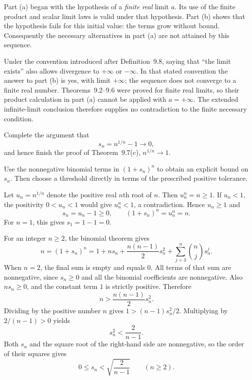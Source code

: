 Part \textup{(a)} began with the hypothesis of a \emph{finite real}
limit $a$. Its use of the finite product and scalar limit laws is
valid under that hypothesis. Part \textup{(b)} shows that the
hypothesis fails for this initial value: the terms grow without bound.
Consequently the necessary alternatives in part \textup{(a)} are
not attained by this sequence.

Under the convention introduced after Definition~9.8, saying that
``the limit exists'' also allows divergence to $+\infty$ or
$-\infty$. In that stated convention the answer to part \textup{(b)}
is yes, with limit $+\infty$; the sequence does not converge to a
finite real number. Theorems~9.2--9.6 were proved for finite real
limits, so their product calculation in part \textup{(a)} cannot be
applied with $a=+\infty$. The extended infinite-limit conclusion
therefore supplies no contradiction to the finite necessary condition.


\goal Complete the argument that
\[
 s_n=n^{1/n}-1\longrightarrow0,
\]
and hence finish the proof of Theorem~9.7(c), $n^{1/n}\to1$.

\idea Use the nonnegative binomial terms in $(1+s_n)^n$ to obtain
an explicit bound on $s_n$. Then choose a threshold directly in
terms of the prescribed positive tolerance.

Let $u_n=n^{1/n}$ denote the positive real $n$th root of $n$.
Then $u_n^n=n\ge1$. If $u_n<1$, the positivity $0<u_n<1$
would give $u_n^n<1$, a contradiction. Hence $u_n\ge1$ and
\[
 s_n=u_n-1\ge0,
 \qquad (1+s_n)^n=u_n^n=n.
\]
For $n=1$, this gives $s_1=1-1=0$.

For an integer $n\ge2$, the binomial theorem gives
\[
 n=(1+s_n)^n
   =1+ns_n+\frac{n(n-1)}2s_n^2
      +\sum_{j=3}^{n}\binom nj s_n^j.
\]
When $n=2$, the final sum is empty and equals $0$.
All terms of that sum are nonnegative, since $s_n\ge0$ and all
the binomial coefficients are nonnegative. Also $ns_n\ge0$,
and the constant term $1$ is strictly positive. Therefore
\[
 n>\frac{n(n-1)}2s_n^2.
\]
Dividing by the positive number $n$ gives
$1>(n-1)s_n^2/2$. Multiplying by $2/(n-1)>0$ yields
\[
 s_n^2<\frac2{n-1}.
\]
Both $s_n$ and the square root of the right-hand side are
nonnegative, so the order of their squares gives
\[
 0\le s_n<\sqrt{\frac2{n-1}}\qquad(n\ge2).
\]

